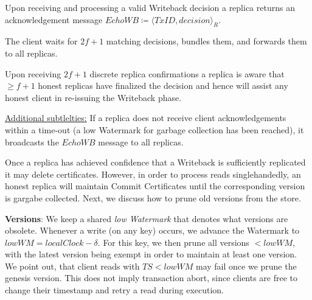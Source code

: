Upon receiving and processing a valid Writeback decision a replica returns an acknowledgement message $EchoWB \coloneqq \langle TxID, decision \rangle_R$.

The client waits for $2f+1$ matching decisions, bundles them, and forwards them to all replicas.

Upon receiving $2f+1$ discrete replica confirmations a replica is aware that $\geq f+1$ honest replicas have finalized the decision and hence will assist any honest client in re-issuing the Writeback phase.

\underline{Additional subtlelties:} If a replica does not receive client acknowledgements within a time-out (a low Watermark for garbage collection has been reached), it broadcasts the $EchoWB$ message to all replicas. 

Once a replica has achieved confidence that a Writeback is sufficiently replicated it may delete certificates. However, in order to process reads singlehandedly, an honest replica will maintain Commit Certificates until the corresponding version is gargabe collected. Next, we discuss how to prune old versions from the store.



\textbf{Versions}: We keep a shared \textit{low Watermark} that denotes what versions are obsolete. Whenever  a write (on any key) occurs, we advance the Watermark to $lowWM = localClock - \delta$. For this key, we then prune all versions $< lowWM$, with the latest version being exempt in order to maintain at least one version.  We point out, that client reads with $TS < lowWM$ may fail once we prune the genesis version. This does not imply transaction abort, since clients are free to change their timestamp and retry a read during execution.

